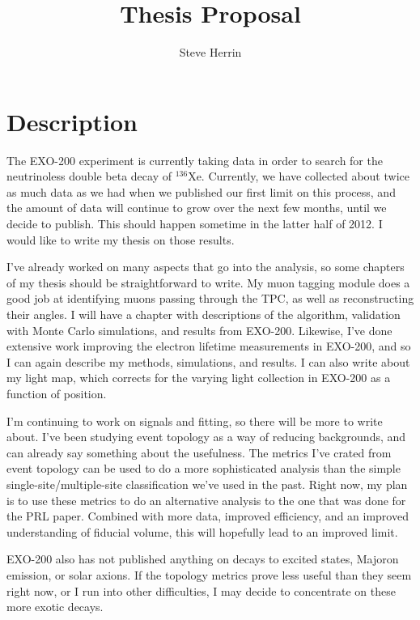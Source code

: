 \documentclass[12pt,letterpaper,onecolumn]{article}
\title{Thesis Proposal}
\author{Steve Herrin}
\newcommand{\isotope}[2]{\(^{#1}\)#2}
\begin{document}
\maketitle
\setlength{\parskip}{9pt}

\section{Description}
The EXO-200 experiment is currently taking data in order to search for the neutrinoless double beta decay of \isotope{136}{Xe}. Currently, we have collected about twice as much data as we had when we published our first limit on this process, and the amount of data will continue to grow over the next few months, until we decide to publish. This should happen sometime in the latter half of 2012. I would like to write my thesis on those results.

I've already worked on many aspects that go into the analysis, so some chapters of my thesis should be straightforward to write. My muon tagging module does a good job at identifying muons passing through the TPC, as well as reconstructing their angles. I will have a chapter with descriptions of the algorithm, validation with Monte Carlo simulations, and results from EXO-200. Likewise, I've done extensive work improving the electron lifetime measurements in EXO-200, and so I can again describe my methods, simulations, and results. I can also write about my light map, which corrects for the varying light collection in EXO-200 as a function of position.

I'm continuing to work on signals and fitting, so there will be more to write about. I've been studying event topology as a way of reducing backgrounds, and can already say something about the usefulness. The metrics I've crated from event topology can be used to do a more sophisticated analysis than the simple single-site/multiple-site classification we've used in the past. Right now, my plan is to use these metrics to do an alternative analysis to the one that was done for the PRL paper. Combined with more data, improved efficiency, and an improved understanding of fiducial volume, this will hopefully lead to an improved limit.

EXO-200 also has not published anything on decays to excited states, Majoron emission, or solar axions. If the topology metrics prove less useful than they seem right now, or I run into other difficulties, I may decide to concentrate on these more exotic decays.

\newpage
\end{document}
